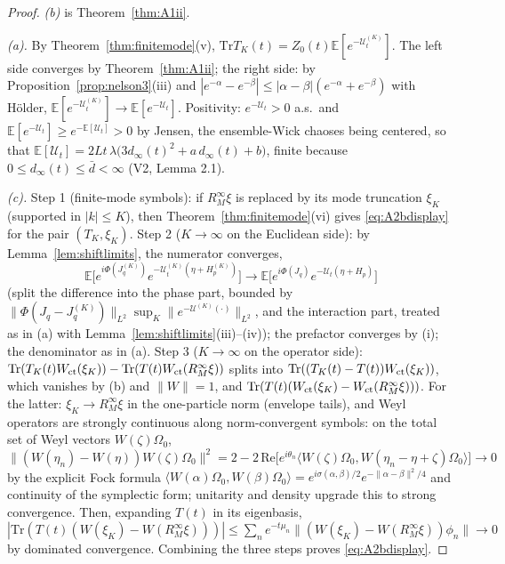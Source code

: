 \documentclass[11pt,a4paper]{article}
\theoremstyle{plain}
\theoremstyle{definition}
\newcommand{\E}{\mathbb{E}}
\newcommand{\U}{\mathcal U}
\newcommand{\ip}[2]{\langle #1,#2\rangle}
\newcommand{\Trace}{\mathrm{Tr}}
\begin{document}
\begin{proof}
\emph{(b)} is Theorem~\ref{thm:A1ii}.

\emph{(a).} By Theorem~\ref{thm:finitemode}(v),
$\Trace T_K(t)=Z_0(t)\E[e^{-\U^{(K)}_t}]$. The left side converges by
Theorem~\ref{thm:A1ii}; the right side: by
Proposition~\ref{prop:nelson3}(iii) and
$|e^{-\alpha}-e^{-\beta}|\le|\alpha-\beta|(e^{-\alpha}+e^{-\beta})$ with
H\"older, $\E[e^{-\U^{(K)}_t}]\to\E[e^{-\U_t}]$. Positivity: $e^{-\U_t}>0$
a.s.\ and $\E[e^{-\U_t}]\ge e^{-\E[\U_t]}>0$ by Jensen, the ensemble-Wick
chaoses being centered, so that
$\E[\U_t]=2Lt\,\lambda\bigl(3d_\infty(t)^2+a\,d_\infty(t)+b\bigr)$, finite
because $0\le d_\infty(t)\le\bar d<\infty$ (V2, Lemma 2.1).

\emph{(c).} Step 1 (finite-mode symbols): if $R_M^\infty\xi$ is replaced
by its mode truncation $\xi_K$ (supported in $|k|\le K$), then
Theorem~\ref{thm:finitemode}(vi) gives \eqref{eq:A2bdisplay} for the
pair $(T_K,\xi_K)$. Step 2 ($K\to\infty$ on the Euclidean side): by
Lemma~\ref{lem:shiftlimits}, the numerator converges,
\[
 \E\bigl[e^{i\Phi(J^{(K)}_q)}e^{-\U^{(K)}_t(\eta+H^{(K)}_p)}\bigr]
 \longrightarrow
 \E\bigl[e^{i\Phi(J_q)}e^{-\U_t(\eta+H_p)}\bigr]
\]
(split the difference into the phase part, bounded by
$\|\Phi(J_q-J^{(K)}_q)\|_{L^2}\sup_K\|e^{-\U^{(K)}(\cdot)}\|_{L^2}$, and
the interaction part, treated as in (a) with
Lemma~\ref{lem:shiftlimits}(iii)--(iv)); the prefactor converges by
(i); the denominator as in (a). Step 3 ($K\to\infty$ on the operator
side): $\Trace(T_K(t)W_{\rm ct}(\xi_K))-\Trace(T(t)W_{\rm ct}
(R_M^\infty\xi))$ splits into
$\Trace((T_K(t)-T(t))W_{\rm ct}(\xi_K))$, which vanishes by (b) and
$\|W\|=1$, and $\Trace(T(t)(W_{\rm ct}(\xi_K)-W_{\rm ct}
(R_M^\infty\xi)))$. For the latter: $\xi_K\to R_M^\infty\xi$ in the
one-particle norm (envelope tails), and Weyl operators are strongly
continuous along norm-convergent symbols: on the total set of Weyl
vectors $W(\zeta)\Omega_0$,
$\|(W(\eta_n)-W(\eta))W(\zeta)\Omega_0\|^2
=2-2\,\mathrm{Re}\bigl[e^{i\theta_n}\ip{W(\zeta)\Omega_0}
{W(\eta_n-\eta+\zeta)\Omega_0}\bigr]\to0$ by the explicit Fock formula
$\ip{W(\alpha)\Omega_0}{W(\beta)\Omega_0}
=e^{i\sigma(\alpha,\beta)/2}e^{-\|\alpha-\beta\|^2/4}$ and continuity of
the symplectic form; unitarity and density upgrade this to strong
convergence. Then, expanding $T(t)$ in its eigenbasis,
$|\Trace(T(t)(W(\xi_K)-W(R_M^\infty\xi)))|
\le\sum_n e^{-t\mu_n}\|(W(\xi_K)-W(R_M^\infty\xi))\phi_n\|\to0$
by dominated convergence. Combining the three steps proves
\eqref{eq:A2bdisplay}.
\end{proof}
\end{document}
